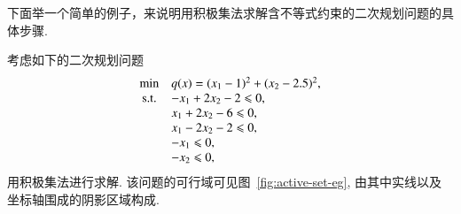 
下面举一个简单的例子，来说明用积极集法求解含不等式约束的二次规划问题的具体步骤.

\begin{exam}\label{eg:qp-active-set-algo}
考虑如下的二次规划问题
\begin{equation*}
\begin{array}{cl}
\min & q({x}) = (x_1 - 1)^2 + (x_2 - 2.5)^2, \\
{\rm s.t.} & -x_1 + 2x_2 - 2 \leqslant 0, \\
& x_1 + 2x_2 - 6 \leqslant 0, \\
& x_1 - 2x_2 - 2 \leqslant 0, \\
& -x_1 \leqslant 0, \\
& -x_2 \leqslant 0,
\end{array}
\end{equation*}
用积极集法进行求解. 该问题的可行域可见图~\ref{fig:active-set-eg}, 由其中实线以及坐标轴围成的阴影区域构成.





\end{exam}
